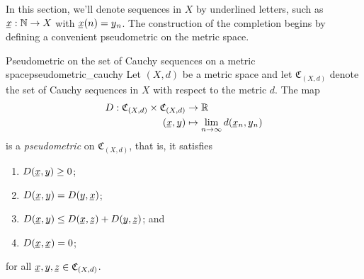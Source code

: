 \newcommand{\sequnder}[1]{\underline{\smash{#1}\mkern-2mu}\mkern2mu}
In this section, we'll denote sequences in \(X\) by underlined letters, such as \(\sequnder{x} : \mathbb{N} \to X\)  with \(\sequnder{x}(n) = \sequnder{y}_n\). The construction of the completion begins by defining a convenient pseudometric on the metric space.
\begin{lemma}{Pseudometric on the set of Cauchy sequences on a metric space}{pseudometric_cauchy}
    Let \((X, d)\) be a metric space and let \(\mathfrak{C}_{(X,d)}\) denote the set of Cauchy sequences in \(X\) with respect to the metric \(d\). The map
    \begin{align*}
        D : \mathfrak{C}_{(X,d)} \times \mathfrak{C}_{(X,d)} &\to \mathbb{R}\\
        (\sequnder{x},\sequnder{y}) &\mapsto \lim_{n\to \infty}{d(\sequnder{x}_n, \sequnder{y}_n)}
    \end{align*}
    is a \emph{pseudometric} on \(\mathfrak{C}_{(X,d)}\), that is, it satisfies
    \begin{enumerate}[label=(\alph*)]
        \item \(D(\sequnder{x}, \sequnder{y}) \geq 0\);
        \item \(D(\sequnder{x},\sequnder{y}) = D(\sequnder{y},\sequnder{x})\);
        \item \(D(\sequnder{x},\sequnder{y}) \leq D(\sequnder{x},\sequnder{z}) + D(\sequnder{y}, \sequnder{z})\); and
        \item \(D(\sequnder{x},\sequnder{x}) = 0\);
    \end{enumerate}
    for all \(\sequnder{x}, \sequnder{y}, \sequnder{z} \in \mathfrak{C}_{(X,d)}\).
\end{lemma}
